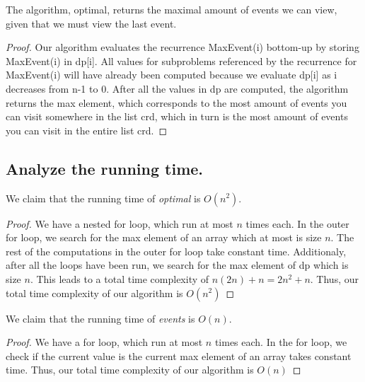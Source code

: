 \documentclass[11pt]{scrartcl}
\begin{document}
	\begin{corollary*}
		The algorithm, optimal, returns the maximal amount of events we can view, given that we must view the last event.

		\begin{proof}
			Our algorithm evaluates the recurrence MaxEvent(i) bottom-up by storing MaxEvent(i) in dp[i].
			All values for subproblems referenced by the recurrence for MaxEvent(i) will have already been computed
			because we evaluate dp[i] as i decreases from n-1 to 0.
			After all the values in dp are computed, the algorithm returns the max element,
			which corresponds to the most amount of events you can visit somewhere in the list crd,
			which in turn is the most amount of events you can visit in the entire list crd.
		\end{proof}

	\end{corollary*}
\fi


\iffalse
	\begin{corollary*}
		The algorithm, events, correctly traces the events selected.
		\begin{proof}
			$$\textbf{DO THIS PART }$$
		\end{proof}
	\end{corollary*}

\fi

\iffalse
	\subsection{
		Analyze the running time.
	}
	We claim that the running time of \textit{optimal} is $O(n^2)$.
	\begin{proof}
		We have a nested for loop, which run at most $n$ times each.
		In the outer for loop, we search for the max element of an array
		which at most is size $n$. The rest of the computations in the outer for loop take constant time.
		Additionaly, after all the loops have been run, we search for the max element of dp which is
		size $n$. This leads to a total time complexity of $n(2n) + n = 2n^2 + n$.
		Thus, our total time complexity of our algorithm is $O(n^2)$
	\end{proof}
	We claim that the running time of \textit{events} is $O(n)$.
	\begin{proof}
		We have a for loop, which run at most $n$ times each.
		In the for loop, we check if the current value is the current max element of an array takes constant time.
		Thus, our total time complexity of our algorithm is $O(n)$
	\end{proof}
\end{document}
